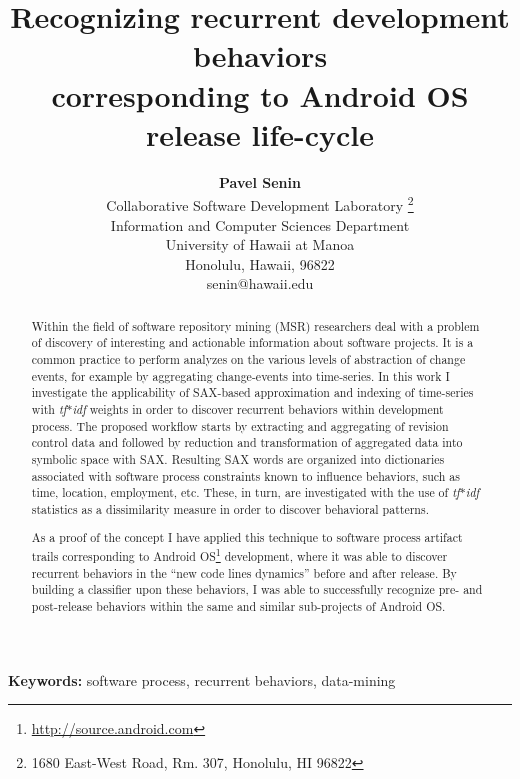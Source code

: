 \documentclass[conference]{worldcomp}
\title{\bf Recognizing recurrent development behaviors\\ corresponding to Android OS release life-cycle}           %
\author{
{\bfseries Pavel Senin}\\
Collaborative Software Development Laboratory \thanks{1680 East-West Road, Rm. 307, Honolulu, HI 96822}\\
Information and Computer Sciences Department\\
University of Hawaii at Manoa\\
Honolulu, Hawaii, 96822\\
senin@hawaii.edu}
\begin{document}
\maketitle                        %

\begin{abstract}
Within the field of software repository mining (MSR) researchers deal with a problem 
of discovery of interesting and actionable information about software projects.
It is a common practice to perform analyzes on the various levels of abstraction 
of change events, for example by aggregating change-events into time-series.
In this work I investigate the applicability of SAX-based approximation and 
indexing of time-series with \textit{tf$\ast$idf} weights in order to discover 
recurrent behaviors within development process. 
The proposed workflow starts by extracting and aggregating of revision control data 
and followed by reduction and transformation of aggregated data into symbolic space with SAX. 
Resulting SAX words are organized into dictionaries associated with software process 
constraints known to influence behaviors, such as time, location, employment, etc. 
These, in turn, are investigated with the use of \textit{tf$\ast$idf} 
statistics as a dissimilarity measure in order to discover behavioral patterns.

As a proof of the concept I have applied this technique to software process artifact trails 
corresponding to Android OS\footnote[1]{\url{http://source.android.com}} development, where
it was able to discover recurrent behaviors in the ``new code lines dynamics'' before 
and after release. By building a classifier upon these behaviors, I was able to successfully 
recognize pre- and post-release behaviors within the same and similar sub-projects of Android OS.
\end{abstract}

\vspace{1em}
\noindent\textbf{Keywords:}
 {\small  software process, recurrent behaviors, data-mining} %

%
\end{document}
